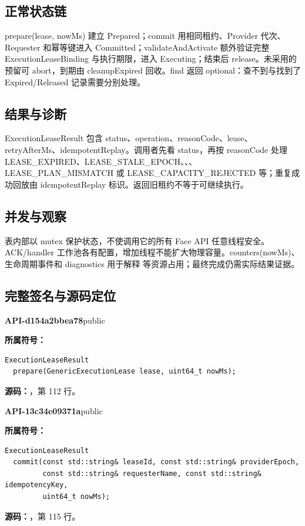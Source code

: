\subsection{正常状态链}
prepare(lease, nowMs) 建立 Prepared；commit 用相同租约、Provider 代次、Requester 和幂等键进入 Committed；validateAndActivate 额外验证完整 ExecutionLeaseBinding 与执行期限，进入 Executing；结束后 release。未采用的预留可 abort，到期由 cleanupExpired 回收。find 返回 optional：查不到与找到了 Expired/Released 记录需要分别处理。

\subsection{结果与诊断}
ExecutionLeaseResult 包含 status、operation、reasonCode、lease、retryAfterMs、idempotentReplay。调用者先看 status，再按 reasonCode 处理 LEASE\_EXPIRED、LEASE\_STALE\_EPOCH、、、LEASE\_PLAN\_MISMATCH 或 LEASE\_CAPACITY\_REJECTED 等；重复成功回放由 idempotentReplay 标识。返回旧租约不等于可继续执行。

\subsection{并发与观察}
表内部以 mutex 保护状态，不使调用它的所有 Face API 任意线程安全。ACK/handler 工作池各有配置，增加线程不能扩大物理容量。counters(nowMs)、生命周期事件和 diagnostics 用于解释  等资源占用；最终完成仍需实际结果证据。

\subsection{完整签名与源码定位}

\textbf{API-d154a2bbea78}\quad public\par
\textbf{所属符号：}\par
\begin{Verbatim}[fontsize=\footnotesize,breaklines,breakanywhere]
ExecutionLeaseResult
  prepare(GenericExecutionLease lease, uint64_t nowMs);
\end{Verbatim}
\textbf{源码：}，第 112 行。\par

\textbf{API-13c34e09371a}\quad public\par
\textbf{所属符号：}\par
\begin{Verbatim}[fontsize=\footnotesize,breaklines,breakanywhere]
ExecutionLeaseResult
  commit(const std::string& leaseId, const std::string& providerEpoch,
         const std::string& requesterName, const std::string& idempotencyKey,
         uint64_t nowMs);
\end{Verbatim}
\textbf{源码：}，第 115 行。\par

